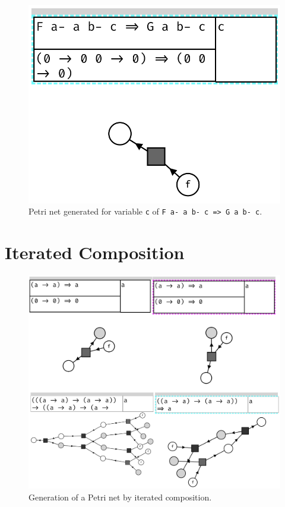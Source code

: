 \documentclass[11pt,openright,hidelinks,a4paper]{article}
\begin{document}
\begin{figure}[H]
\begin{center}
\includegraphics[scale=0.45]{typec}
\end{center}
\caption{Petri net generated for variable \lstinline{c} of \lstinline{F a- a b- c => G a b- c}.}
\label{fig:typec}
\end{figure}

\section{Iterated Composition}\label{app:itcomp}
\begin{figure}[H]
\begin{center}
\includegraphics[scale=0.45]{compose2}
\end{center}
\caption{Generation of a Petri net by iterated composition.}
\label{fig:compose2}
\end{figure}
\end{document}
